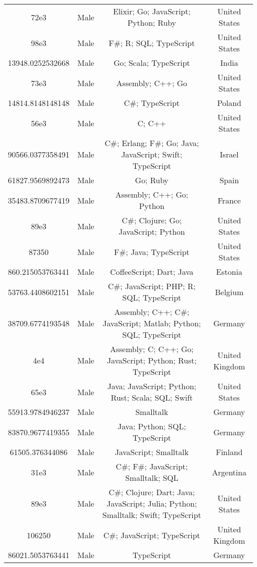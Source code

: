 \begin{center}
\begin{tabular}{ |c|c|c|c| }
72e3  &  Male  &  Elixir; Go; JavaScript; Python; Ruby  &  United States  \\ 
98e3  &  Male  &  F\#; R; SQL; TypeScript  &  United States  \\ 
13948.0252532668  &  Male  &  Go; Scala; TypeScript  &  India  \\ 
73e3  &  Male  &  Assembly; C++; Go  &  United States  \\ 
14814.8148148148  &  Male  &  C\#; TypeScript  &  Poland  \\ 
56e3  &  Male  &  C; C++  &  United States  \\ 
90566.0377358491  &  Male  &  C\#; Erlang; F\#; Go; Java; JavaScript; Swift; TypeScript  &  Israel  \\ 
61827.9569892473  &  Male  &  Go; Ruby  &  Spain  \\ 
35483.8709677419  &  Male  &  Assembly; C++; Go; Python  &  France  \\ 
89e3  &  Male  &  C\#; Clojure; Go; JavaScript; Python  &  United States  \\ 
87350  &  Male  &  F\#; Java; TypeScript  &  United States  \\ 
860.215053763441  &  Male  &  CoffeeScript; Dart; Java  &  Estonia  \\ 
53763.4408602151  &  Male  &  C\#; JavaScript; PHP; R; SQL; TypeScript  &  Belgium  \\ 
38709.6774193548  &  Male  &  Assembly; C++; C\#; JavaScript; Matlab; Python; SQL; TypeScript  &  Germany  \\ 
4e4  &  Male  &  Assembly; C; C++; Go; JavaScript; Python; Rust; TypeScript  &  United Kingdom  \\ 
65e3  &  Male  &  Java; JavaScript; Python; Rust; Scala; SQL; Swift  &  United States  \\ 
55913.9784946237  &  Male  &  Smalltalk  &  Germany  \\ 
83870.9677419355  &  Male  &  Java; Python; SQL; TypeScript  &  Germany  \\ 
61505.376344086  &  Male  &  JavaScript; Smalltalk  &  Finland  \\ 
31e3  &  Male  &  C\#; F\#; JavaScript; Smalltalk; SQL  &  Argentina  \\ 
89e3  &  Male  &  C\#; Clojure; Dart; Java; JavaScript; Julia; Python; Smalltalk; Swift; TypeScript  &  United States  \\ 
106250  &  Male  &  C\#; JavaScript; TypeScript  &  United Kingdom  \\ 
86021.5053763441  &  Male  &  TypeScript  &  Germany  \\ 

\end{tabular}
\end{center}
